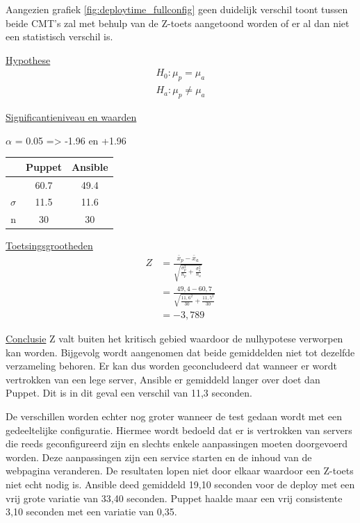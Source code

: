 Aangezien grafiek \ref{fig:deploytime_fullconfig} geen duidelijk verschil toont tussen beide CMT's zal met behulp van de Z-toets aangetoond worden of er al dan niet een statistisch verschil is.

\underline{Hypothese}
\begin{align*}
H_0:  \mu_p = \mu_a \\
H_a: \mu_p\neq \mu_a 
\end{align*}


\underline{Significantieniveau en waarden} \newline

 $\alpha$ = 0.05 => -1.96 en +1.96 \newline

		\begin{tabular}{ r |c |c }
			& Puppet & Ansible\\\hline
			\unexpanded{$ \bar x  $} &  60.7 & 49.4\\ \hline
			$\sigma$ & 11.5 & 11.6\\ \hline
			n &  30 &  30

\end{tabular}


\underline{Toetsingsgrootheden}
\begin{equation} \label{eq1}
\begin{split}
Z &= \tfrac{\bar x_p - \bar x_a}{\sqrt{\tfrac{\sigma_p^2}{n_p}+\tfrac{\sigma_a^2}{n_a}}}\\
& = \tfrac{49,4 - 60,7}{\sqrt{\tfrac{11,6^2}{30}+\tfrac{11,5^2}{30}}} \\
& = -3,789
\end{split}
\end{equation}



\underline{Conclusie} \newline
Z valt buiten het kritisch gebied waardoor de nulhypotese verworpen kan worden. Bijgevolg wordt aangenomen dat beide gemiddelden niet tot dezelfde verzameling behoren. Er kan dus worden geconcludeerd dat wanneer er wordt vertrokken van een lege server, Ansible er gemiddeld langer over doet dan Puppet. Dit is in dit geval een verschil van 11,3 seconden. \newline

De verschillen worden echter nog groter wanneer de test gedaan wordt met een gedeeltelijke configuratie. Hiermee wordt bedoeld dat er is vertrokken van servers die reeds geconfigureerd zijn en slechts enkele aanpassingen moeten doorgevoerd worden. Deze aanpassingen zijn een service starten en de inhoud van de webpagina veranderen. De resultaten lopen niet door elkaar waardoor een Z-toets niet echt nodig is. Ansible deed gemiddeld 19,10 seconden voor de deploy met een vrij grote variatie van 33,40 seconden. Puppet haalde maar een vrij consistente 3,10 seconden met een variatie van 0,35. \newline

